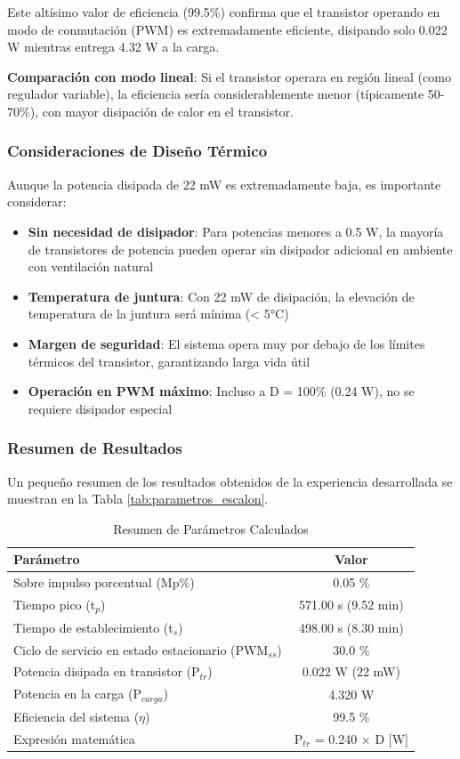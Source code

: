 Este altísimo valor de eficiencia (99.5\%) confirma que el transistor operando en modo de conmutación (PWM) es extremadamente eficiente, disipando solo 0.022 W mientras entrega 4.32 W a la carga. 

\textbf{Comparación con modo lineal}: Si el transistor operara en región lineal (como regulador variable), la eficiencia sería considerablemente menor (típicamente 50-70\%), con mayor disipación de calor en el transistor.

\subsubsection{Consideraciones de Diseño Térmico}

Aunque la potencia disipada de 22 mW es extremadamente baja, es importante considerar:

\begin{itemize}
	\item \textbf{Sin necesidad de disipador}: Para potencias menores a 0.5 W, la mayoría de transistores de potencia pueden operar sin disipador adicional en ambiente con ventilación natural
	\item \textbf{Temperatura de juntura}: Con 22 mW de disipación, la elevación de temperatura de la juntura será mínima (< 5°C)
	\item \textbf{Margen de seguridad}: El sistema opera muy por debajo de los límites térmicos del transistor, garantizando larga vida útil
	\item \textbf{Operación en PWM máximo}: Incluso a D = 100\% (0.24 W), no se requiere disipador especial
\end{itemize}

\subsubsection{Resumen de Resultados}
Un pequeño resumen de los resultados obtenidos de la experiencia desarrollada se muestran en la Tabla \ref{tab:parametros_escalon}.

\begin{table}[H]
	\centering
	\caption{Resumen de Parámetros Calculados}
	\label{tab:resumen}
	\begin{tabular}{|l|c|}
		\hline
		\textbf{Parámetro} & \textbf{Valor} \\ \hline
		Sobre impulso porcentual (Mp\%) & 0.05 \% \\ \hline
		Tiempo pico (t$_p$) & 571.00 s (9.52 min) \\ \hline
		Tiempo de establecimiento (t$_s$) & 498.00 s (8.30 min) \\ \hline
		Ciclo de servicio en estado estacionario (PWM$_{ss}$) & 30.0 \% \\ \hline
		Potencia disipada en transistor (P$_{tr}$) & 0.022 W (22 mW) \\ \hline
		Potencia en la carga (P$_{carga}$) & 4.320 W \\ \hline
		Eficiencia del sistema ($\eta$) & 99.5 \% \\ \hline
		Expresión matemática & P$_{tr}$ = 0.240 × D [W] \\ \hline
	\end{tabular}
\end{table}

